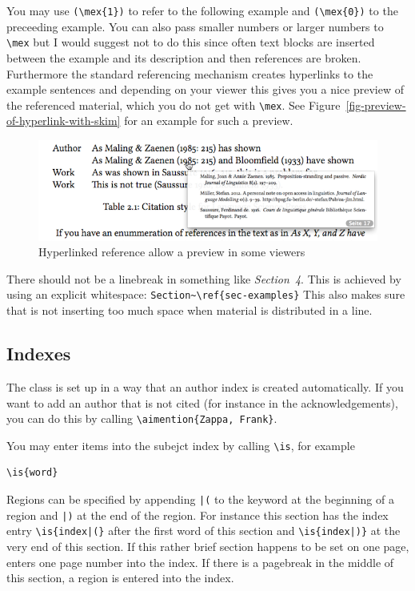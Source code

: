 You may use \verb+(\mex{1})+ to refer to the following example and \verb+(\mex{0})+ to the preceeding
example. You can also pass smaller numbers or larger numbers to \verb+\mex+ but I would suggest not
to do this since often text blocks are inserted between the example and its description and then
references are broken. Furthermore the standard referencing mechanism creates hyperlinks to the
example sentences and depending on your viewer this gives you a nice preview of the referenced
material, which you do not get with \verb+\mex+. See Figure~\vref{fig-preview-of-hyperlink-with-skim} for an example for such a preview.
\begin{figure}[htbp]
\includegraphics[width=\linewidth]{crossref.png}
\caption{\label{fig-preview-of-hyperlink-with-skim}Hyperlinked reference allow a preview in some viewers}
\end{figure}


There should not be a linebreak in something like \emph{Section~4}. This is achieved by using an explicit
whitespace: \verb+Section~\ref{sec-examples}+ This also makes sure that \latex is not inserting too
much space when material is distributed in a line.

\subsection{Indexes}

The \lsp class is set up in a way that an author index is created automatically. If you want to add
an author that is not cited (for instance in the acknowledgements), you can do this by calling
\verb+\aimention{Zappa, Frank}+.

You may enter items into the subejct index by calling \verb+\is+, for example 
\begin{verbatim}
\is{word}
\end{verbatim}

Regions can be specified by appending \verb+|(+ to the keyword at the beginning of a region and
\verb+|)+ at the end of the region. For instance this section has the index entry
\verb+\is{index|(}+ after the first word of this section and \verb+\is{index|)}+ at the very end of
this section. If this rather brief section happens to be set on one page, \latex enters one page
number into the index. If there is a pagebreak in the middle of this section, a region is entered
into the index.

